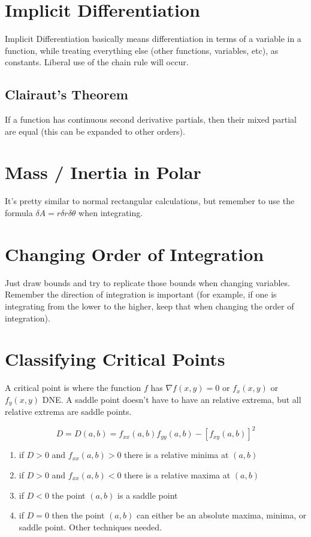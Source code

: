 \documentclass{article}
\begin{document}
\section{Implicit Differentiation}

Implicit Differentiation basically means differentiation in terms of a variable in a function, while treating everything else (other functions, variables, etc), as constants. Liberal use of the chain rule will occur.

\subsection{Clairaut's Theorem}

If a function has continuous second derivative partials, then their mixed partial are equal (this can be expanded to other orders).

\section{Mass / Inertia in Polar}

It's pretty similar to normal rectangular calculations, but remember to use the formula $\delta A = r \delta r \delta \theta$ when integrating.


\section{Changing Order of Integration}

Just draw bounds and try to replicate those bounds when changing variables. Remember the direction of integration is important (for example, if one is integrating from the lower to the higher, keep that when changing the order of integration).

\section{Classifying Critical Points}

A critical point is where the function $f$ has $\nabla f(x,y) = 0$ or $f_x(x, y)$ or $f_y(x, y)$ DNE. A saddle point doesn't have to have an relative extrema, but all relative extrema are saddle points.

$$D = D(a, b) = f_{xx}(a, b)f_{yy}(a,b) - \left[f_{xy}(a, b)\right]^2$$

\begin{enumerate}
    \item if $D > 0$ and $f_{xx}(a,b) > 0$ there is a relative minima at $(a,b)$
    \item if $D > 0$ and $f_{xx}(a,b) < 0$ there is a relative maxima at $(a,b)$
    \item if $D < 0$ the point $(a,b)$ is a saddle point
    \item if $D = 0$ then the point $(a,b)$ can either be an absolute maxima, minima, or saddle point. Other techniques needed.
\end{enumerate}
\end{document}
